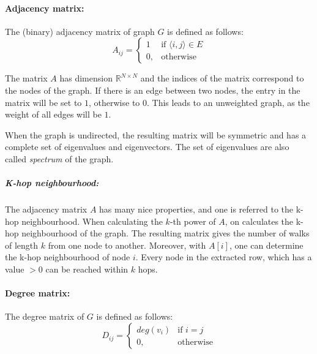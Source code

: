 \paragraph{Adjacency matrix:}

The (binary) adjacency matrix of graph $G$ is defined as follows:
\begin{equation}
    \label{eg:AdjacencyMatrix}
    A_{ij} =    
    \begin{cases}
        1  & \text{if } \langle i , j \rangle \in E \\
        0, & \text{otherwise}
    \end{cases}
\end{equation}

The matrix $A$ has dimension $\mathbb{R}^{N \times N}$ and the indices of the matrix correspond to the nodes of the graph.
If there is an edge between two nodes, the entry in the matrix will be set to $1$, otherwise to $0$.
This leads to an unweighted graph, as the weight of all edges will be $1$. 

When the graph is undirected, the resulting matrix will be symmetric and has a complete set of eigenvalues
and eigenvectors. The set of eigenvalues are also called \textit{spectrum} of the graph.

\subparagraph{K-hop neighbourhood:}
The adjacency matrix $A$ has many nice properties, and one is referred to the k-hop neighbourhood. 
When calculating the $k$-th power of $A$, on calculates the k-hop neighbourhood of the graph.
The resulting matrix gives the number of walks of length $k$ from one node to another.
Moreover, with $A[i]$, one can determine the k-hop neighbourhood of node $i$. 
Every node in the extracted row, which has a value $> 0$ can be reached within $k$ hops.

\paragraph{Degree matrix:}
The degree matrix of $G$ is defined as follows:
\begin{equation}
    D_{ij} =    
    \begin{cases}
        deg(v_i)  & \text{if } i = j \\
        0, & \text{otherwise}
    \end{cases}
\end{equation}

